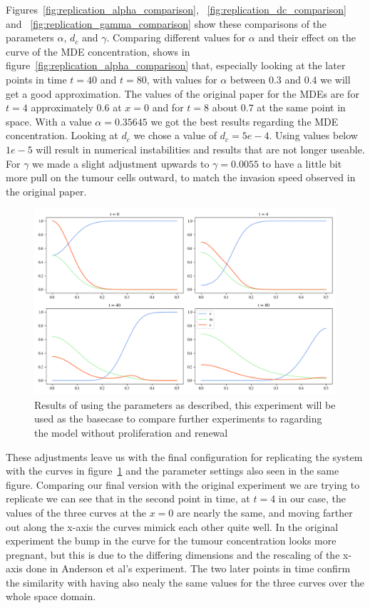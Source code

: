 Figures~\ref{fig:replication_alpha_comparison}, ~\ref{fig:replication_dc_comparison} and ~\ref{fig:replication_gamma_comparison} show these comparisons of the parameters $\alpha$, $d_c$ and $\gamma$. Comparing different values for $\alpha$ and their effect on the curve of the MDE concentration, shows in figure~\ref{fig:replication_alpha_comparison} that, especially looking at the later points in time $t=40$ and $t=80$, with values for $\alpha$ between $0.3$ and $0.4$ we will get a good approximation. The values of the original paper for the MDEs are for $t=4$ approximately $0.6$ at $x=0$ and for $t=8$ about $0.7$ at the same point in space. With a value  $\alpha=0.35645$ we got the best results regarding the MDE concentration.\newline 
Looking at $d_c$ we chose a value of $d_c=5e-4$. Using values below $1e-5$ will result in numerical instabilities and results that are not longer useable. For $\gamma$ we made a slight adjustment upwards to $\gamma=0.0055$ to have a little bit more pull on the tumour cells outward, to match the invasion speed observed in the original paper. 
\begin{figure}[h]
    \centering
    \includegraphics[width=\textwidth]{resources/images/basecase_without_proliferation_.png}
    \caption{Results of using the parameters as described, this experiment will be used as the basecase to compare further experiments to ragarding the model without proliferation and renewal}
    \label{fig:basecase_without_proliferation}
\end{figure}

These adjustments leave us with the final configuration for replicating the system with the curves in figure~\ref{fig:basecase_without_proliferation} and the parameter settings also seen in the same figure. Comparing our final version with the original experiment we are trying to replicate we can see that in the second point in time, at $t=4$ in our case, the values of the three curves at the $x=0$ are nearly the same, and moving farther out along the x-axis the curves mimick each other quite well. In the original experiment the bump in the curve for the tumour concentration looks more pregnant, but this is due to the differing dimensions and the rescaling of the x-axis done in Anderson et al's experiment. The two later points in time confirm the similarity with having also nealy the same values for the three curves over the whole space domain.



